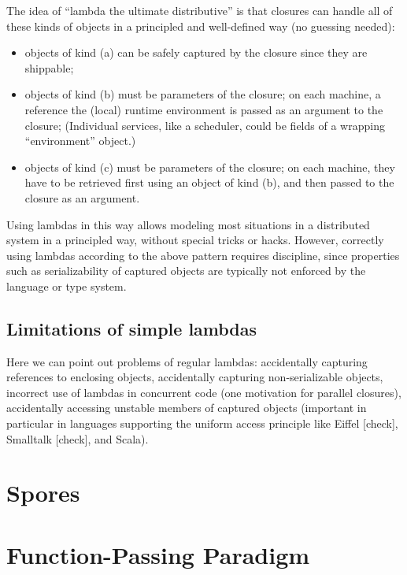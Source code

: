 \documentclass{llncs}
\begin{document}
The idea of ``lambda the ultimate distributive'' is that closures can handle
all of these kinds of objects in a principled and well-defined way (no
guessing needed):

\begin{itemize}

\item objects of kind (a) can be safely captured by the closure since they are shippable;

\item objects of kind (b) must be parameters of the closure; on each machine,
a reference the (local) runtime environment is passed as an argument to the
closure; (Individual services, like a scheduler, could be fields of a
wrapping ``environment'' object.)

\item objects of kind (c) must be parameters of the closure; on each machine,
they have to be retrieved first using an object of kind (b), and then passed
to the closure as an argument.

\end{itemize}

Using lambdas in this way allows modeling most situations 
in a distributed system in a principled way, without special tricks or
hacks. However, correctly using lambdas according to the above pattern
requires discipline, since properties such as serializability of captured
objects are typically not enforced by the language or type system.

\subsection{Limitations of simple lambdas}

Here we can point out problems of regular lambdas: accidentally capturing
references to enclosing objects, accidentally capturing non-serializable
objects, incorrect use of lambdas in concurrent code (one motivation for
parallel closures), accidentally accessing unstable members of captured
objects (important in particular in languages supporting the uniform access
principle like Eiffel [check], Smalltalk [check], and Scala).


\section{Spores}


\section{Function-Passing Paradigm}
\end{document}
